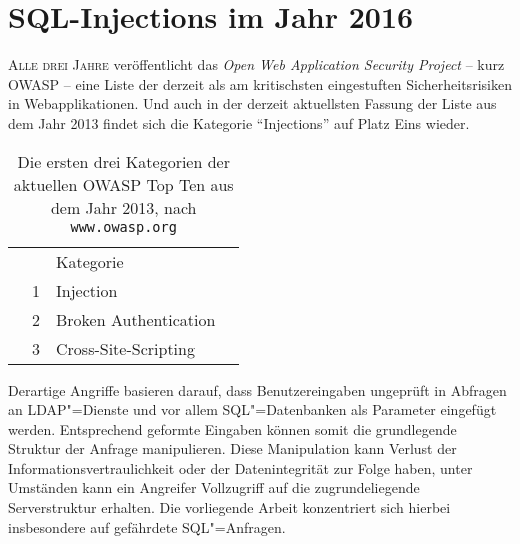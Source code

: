 





\tableofcontents

\chapter{SQL-Injections im Jahr 2016}

\lettrine[lines=2]{A}{lle drei Jahre }veröffentlicht das \emph{Open Web Application Security Project} -- kurz OWASP -- eine Liste der derzeit als am kritischsten eingestuften Sicherheitsrisiken in Webapplikationen. Und auch in der derzeit aktuellsten Fassung der Liste aus dem Jahr 2013 findet sich die Kategorie \enquote{Injections} auf Platz Eins wieder.

\begin{table}[ht!]
\begin{margincap}
\caption{Die ersten drei Kategorien der aktuellen OWASP Top Ten aus dem Jahr 2013, nach \texttt{www.owasp.org}}
\label{tab:owasp_top_ten}
\centering
\begin{tabu} to 
	\rowfont{\sffamily\bfseries\leavevmode\color{tableHeaderText}}
	& & Kategorie & \\
	\rowfont{\sffamily}
	& 1 & Injection & \\
	\rowfont{\sffamily}
	& 2 & Broken Authentication & \\
	\rowfont{\sffamily}
	& 3 & Cross-Site-Scripting & \\
\end{tabu}
\end{margincap}
\end{table}

Derartige Angriffe basieren darauf, dass Benutzereingaben ungeprüft in Abfragen an LDAP"=Dienste und vor allem SQL"=Datenbanken als Parameter eingefügt werden. Entsprechend geformte Eingaben können somit die grundlegende Struktur der Anfrage manipulieren. Diese Manipulation kann Verlust der Informationsvertraulichkeit oder der Datenintegrität zur Folge haben, unter Umständen kann ein Angreifer Vollzugriff auf die zugrundeliegende Serverstruktur erhalten. Die vorliegende Arbeit konzentriert sich hierbei insbesondere auf gefährdete SQL"=Anfragen.

